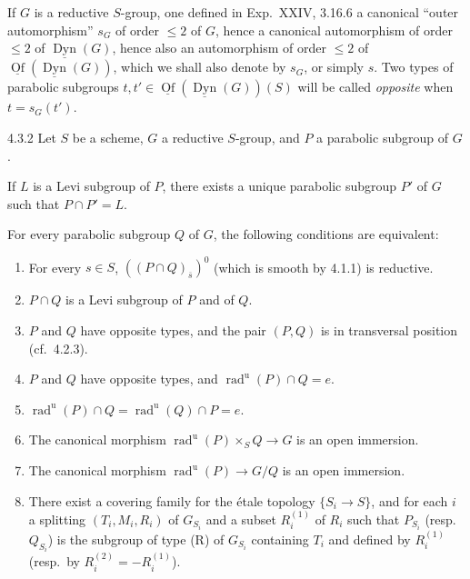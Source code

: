 \label{XXVI.4.3.1}
If $G$ is a reductive $S$-group, one defined in Exp.~XXIV, 3.16.6 a canonical ``outer automorphism'' $s_G$ of order $\le2$ of $G$, hence a canonical automorphism of order $\le2$ of $\underline{\operatorname{Dyn}}(G)$, hence also an automorphism of order $\le2$ of $\underline{\operatorname{Of}}(\underline{\operatorname{Dyn}}(G))$, which we shall also denote by $s_G$, or simply $s$. Two types of parabolic subgroups $t,t'\in\underline{\operatorname{Of}}(\underline{\operatorname{Dyn}}(G))(S)$ will be called \emph{opposite} when $t=s_G(t')$.
\begin{theorem}{4.3.2}\label{XXVI.4.3.2}
Let $S$ be a scheme, $G$ a reductive $S$-group, and $P$ a parabolic subgroup of $G$.
\begin{enumeratea}
\item If $L$ is a Levi subgroup of $P$, there exists a unique parabolic subgroup $P'$ of $G$ such that $P\cap P'=L$.
\item For every parabolic subgroup $Q$ of $G$, the following conditions are equivalent:
\begin{enumerate}[label={},leftmargin=2.8em]
\item[(i)] For every $s\in S$, $((P\cap Q)_{\overline s})^0$ (which is smooth by 4.1.1) is reductive.
\item[(ii)] $P\cap Q$ is a Levi subgroup of $P$ and of $Q$.
\item[(iii)] $P$ and $Q$ have opposite types, and the pair $(P,Q)$ is in transversal position (cf.~4.2.3).
\item[(iv)] $P$ and $Q$ have opposite types, and $\operatorname{rad}^{\mathrm u}(P)\cap Q=e$.
\item[(v)] $\operatorname{rad}^{\mathrm u}(P)\cap Q=\operatorname{rad}^{\mathrm u}(Q)\cap P=e$.
\item[(vi)] The canonical morphism $\operatorname{rad}^{\mathrm u}(P)\times_S Q\to G$ is an open immersion.
\item[(vi$'$)] The canonical morphism $\operatorname{rad}^{\mathrm u}(P)\to G/Q$ is an open immersion.
\item[(vii)] There exist a covering family for the \'etale topology $\{S_i\to S\}$, and for each $i$ a splitting $(T_i,M_i,R_i)$ of $G_{S_i}$ and a subset $R_i^{(1)}$ of $R_i$ such that $P_{S_i}$ (resp.~$Q_{S_i}$) is the subgroup of type (R) of $G_{S_i}$ containing $T_i$ and defined by $R_i^{(1)}$ (resp.~by $R_i^{(2)}=-R_i^{(1)}$).
\end{enumerate}
\end{enumeratea}
\end{theorem}
